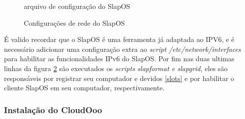 \begin{figure}[ht]
    \centering
    \caption{arquivo de configuração do SlapOS}
    \label{slapos-2}
\end{figure}

\begin{figure}[ht]
    \centering
    \caption{Configurações de rede do SlapOS}
    \label{slapos-rede}
\end{figure}

É valido recordar que o SlapOS é uma ferramenta já adaptada ao IPV6, e é necessário adicionar uma configuração extra ao \textit{script /etc/network/interfaces} para habilitar as funcionalidades IPv6 do SlapOS. Por fim nas duas ultimas linhas da figura \ref{slapos-rede} são executados os \textit{scripts slapformat e slapgrid}, eles são responsáveis por registrar seu computador e devidos \ref{slots} e por habilitar o cliente SlapOS em seu computador, respectivamente.

\subsubsection{Instalação do CloudOoo}

